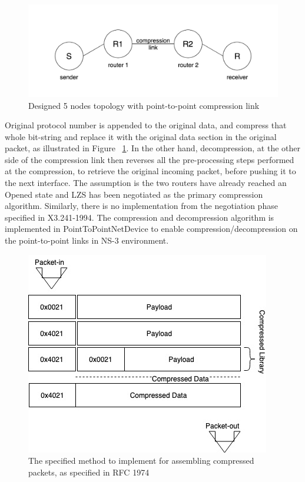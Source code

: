 \documentclass[sigconf]{acmart}
\begin{document}
\begin{figure}[h]
  \centering
  \includegraphics[width=\linewidth]{topology}
  \caption{Designed 5 nodes topology with point-to-point compression link }
  \label{fig:Topo}
\end{figure}

Original protocol number is appended to the original data, and compress that whole bit-string and replace it with the original data section in the original packet, as illustrated in Figure ~\ref{fig:Topo}. 
In the other hand, decompression, at the other side of the compression link then reverses all the pre-processing steps performed at the compression, to retrieve the original incoming packet, before pushing it to the next interface. The assumption is the two routers have already reached an Opened state and LZS has been negotiated as the primary compression algorithm. Similarly, there is no implementation from the negotiation phase specified in X3.241-1994. The compression and decompression algorithm is implemented in PointToPointNetDevice to enable compression/decompression on the point-to-point links in NS-3 environment. 

\begin{figure}[h]
  \centering
  \includegraphics[width=\linewidth]{compression}
  \caption{The specified method to implement for assembling compressed packets, as specified in RFC 1974\cite{Deutsch:1996:ZCD:RFC1950}}
  \label{comp}
\end{figure}
\end{document}

